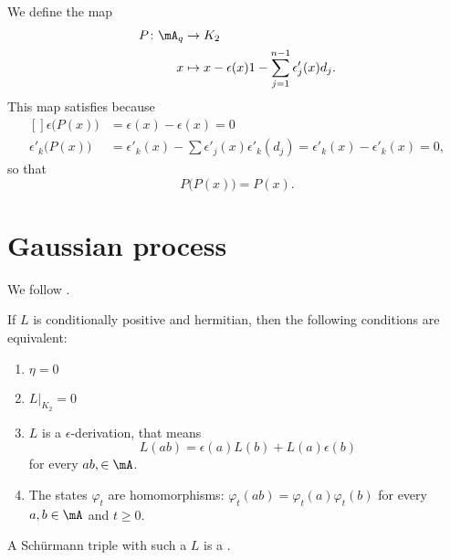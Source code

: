 We define the map
\begin{equation}
    \begin{aligned}
        P\colon \mA_q&\to K_2 \ \\
        x&\mapsto x-\epsilon(x)1-\sum_{j=1}^{n-1}\epsilon'_j(x)d_j. 
    \end{aligned}
\end{equation}
This map satisfies because
\begin{equation}
    \begin{aligned}[]
        \epsilon\big( P(x) \big)&=\epsilon(x)-\epsilon(x)=0\\
        \epsilon'_k\big( P(x) \big)&=\epsilon'_k(x)-\sum\epsilon'_j(x)\epsilon'_k(d_j)=\epsilon'_k(x)-\epsilon'_k(x)=0,
    \end{aligned}
\end{equation}
so that
\begin{equation}
    P\big( P(x) \big)=P(x).
\end{equation}



\section{Gaussian process}

We follow \cite{UweLevy}.

\begin{proposition}
    If $L$ is conditionally positive and hermitian, then the following conditions are equivalent:
    \begin{enumerate}
        \item
            $\eta=0$
        \item
            $L|_{K_2}=0$
        \item
            $L$ is a $\epsilon$-derivation, that means
            \begin{equation}
                L(ab)=\epsilon(a)L(b)+L(a)\epsilon(b)
            \end{equation}
            for every $ab,\in\mA$.
        \item
            The states $\varphi_t$ are homomorphisms: $\varphi_t(ab)=\varphi_t(a)\varphi_t(b)$ for every $a,b\in\mA$ and $t\geq 0$.
    \end{enumerate}
\end{proposition}
A Schürmann triple with such a $L$ is a .

